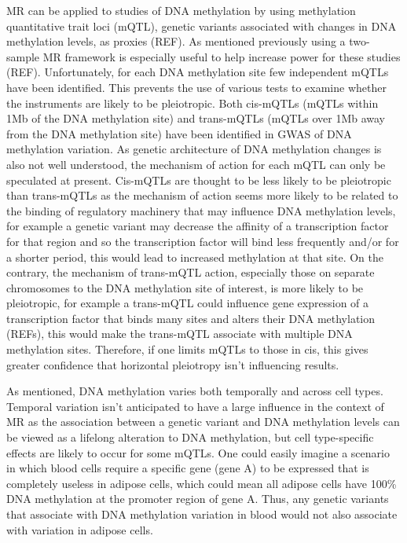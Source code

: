 \documentclass[11pt,twoside]{bristolthesis}
\begin{document}
MR can be applied to studies of DNA methylation by using methylation quantitative trait loci (mQTL), genetic variants associated with changes in DNA methylation levels, as proxies (REF). As mentioned previously using a two-sample MR framework is especially useful to help increase power for these studies (REF). Unfortunately, for each DNA methylation site few independent mQTLs have been identified. This prevents the use of various tests to examine whether the instruments are likely to be pleiotropic. Both cis-mQTLs (mQTLs within 1Mb of the DNA methylation site) and trans-mQTLs (mQTLs over 1Mb away from the DNA methylation site) have been identified in GWAS of DNA methylation variation. As genetic architecture of DNA methylation changes is also not well understood, the mechanism of action for each mQTL can only be speculated at present. Cis-mQTLs are thought to be less likely to be pleiotropic than trans-mQTLs as the mechanism of action seems more likely to be related to the binding of regulatory machinery that may influence DNA methylation levels, for example a genetic variant may decrease the affinity of a transcription factor for that region and so the transcription factor will bind less frequently and/or for a shorter period, this would lead to increased methylation at that site. On the contrary, the mechanism of trans-mQTL action, especially those on separate chromosomes to the DNA methylation site of interest, is more likely to be pleiotropic, for example a trans-mQTL could influence gene expression of a transcription factor that binds many sites and alters their DNA methylation (REFs), this would make the trans-mQTL associate with multiple DNA methylation sites. Therefore, if one limits mQTLs to those in cis, this gives greater confidence that horizontal pleiotropy isn't influencing results.

As mentioned, DNA methylation varies both temporally and across cell types. Temporal variation isn't anticipated to have a large influence in the context of MR as the association between a genetic variant and DNA methylation levels can be viewed as a lifelong alteration to DNA methylation, but cell type-specific effects are likely to occur for some mQTLs. One could easily imagine a scenario in which blood cells require a specific gene (gene A) to be expressed that is completely useless in adipose cells, which could mean all adipose cells have 100\% DNA methylation at the promoter region of gene A. Thus, any genetic variants that associate with DNA methylation variation in blood would not also associate with variation in adipose cells.
\end{document}
